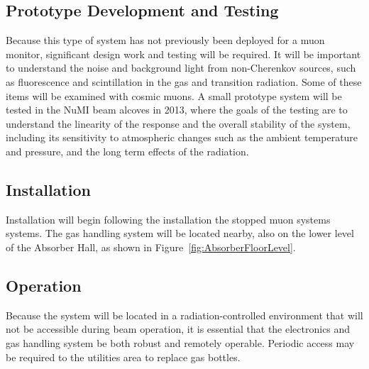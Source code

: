 \subsection{Prototype Development and Testing}

Because this type of system has not previously been deployed for a
muon monitor, significant design work and testing will be required. It will
be important to understand the noise and background light from
non-Cherenkov sources, such as fluorescence and scintillation in the
gas and transition radiation. Some of these items will be examined with cosmic muons.  A 
small prototype system will be tested in the NuMI beam alcoves in 2013, where the goals of the testing 
are to understand the linearity of the response and the overall stability of the system, 
including its sensitivity to atmospheric changes such as the ambient temperature and 
pressure, and the long term effects of the radiation.

\subsection{Installation}

Installation
will begin following the installation the stopped muon systems
systems. The gas handling system will be located nearby, also on the 
lower level of the Absorber Hall, as shown in Figure~\ref{fig:AbsorberFloorLevel}.

\subsection{Operation}

Because the system will be located in a radiation-controlled
environment that will not be accessible during beam operation, it is
essential that the electronics and gas handling system be both robust
and remotely operable.  Periodic access may be required to the utilities area to replace gas bottles.

